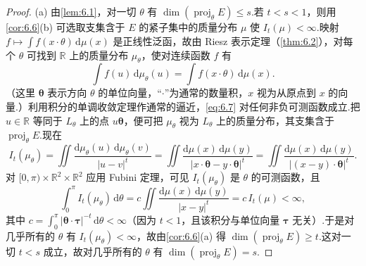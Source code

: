 \begin{proof}
(a) 由\cref{lem:6.1}，对一切 $\theta$ 有 $\dim(\operatorname{proj}_{\theta}E)\leq s$.若 $t<s<1$，则用\cref{cor:6.6}(b) 可选取支集含于 $E$ 的紧子集中的质量分布 $\mu$ 使 $I_t(\mu)<\infty$.映射 $f\mapsto\int f(x\cdot\theta)\,\mathrm{d}\mu(x)$ 是正线性泛函，故由 Riesz 表示定理（\cref{thm:6.2}），对每个 $\theta$ 可找到 $\mathbb{R}$ 上的质量分布 $\mu_\theta$，使对连续函数 $f$ 有
\begin{equation}\label{eq:6.7}
  \int f(u)\,\mathrm{d}\mu_\theta(u)=\int f(x\cdot\theta)\,\mathrm{d}\mu(x).
\end{equation}
（这里 $\boldsymbol{\theta}$ 表示方向 $\theta$ 的单位向量，``$\cdot$''为通常的数量积，$x$ 视为从原点到 $x$ 的向量.）利用积分的单调收敛定理作通常的逼近，\eqref{eq:6.7} 对任何非负可测函数成立.把 $u\in\mathbb{R}$ 等同于 $L_{\theta}$ 上的点 $u\boldsymbol{\theta}$，便可把 $\mu_\theta$ 视为 $L_{\theta}$ 上的质量分布，其支集含于 $\operatorname{proj}_{\theta}E$.现在
\[
  I_t(\mu_\theta)
  =\iint\frac{\mathrm{d}\mu_\theta(u)\,\mathrm{d}\mu_\theta(v)}{|u-v|^{t}}
  =\iint\frac{\mathrm{d}\mu(x)\,\mathrm{d}\mu(y)}{|x\cdot\boldsymbol{\theta}-y\cdot\boldsymbol{\theta}|^{t}}
  =\iint\frac{\mathrm{d}\mu(x)\,\mathrm{d}\mu(y)}{|(x-y)\cdot\boldsymbol{\theta}|^{t}}.
\]
对 $[0,\pi)\times\mathbb{R}^2\times\mathbb{R}^2$ 应用 Fubini 定理，可见 $I_t(\mu_\theta)$ 是 $\theta$ 的可测函数，且
\[
  \int_{0}^{\pi}I_t(\mu_\theta)\,\mathrm{d}\theta
  =c\iint\frac{\mathrm{d}\mu(x)\,\mathrm{d}\mu(y)}{|x-y|^{t}}
  =c\,I_t(\mu)<\infty,
\]
其中 $c=\int_{0}^{\pi}|\boldsymbol{\theta}\cdot\boldsymbol{\tau}|^{-t}\,\mathrm{d}\theta<\infty$（因为 $t<1$，且该积分与单位向量 $\boldsymbol{\tau}$ 无关）.于是对几乎所有的 $\theta$ 有 $I_t(\mu_\theta)<\infty$，故由\cref{cor:6.6}(a) 得 $\dim(\operatorname{proj}_{\theta}E)\geq t$.这对一切 $t<s$ 成立，故对几乎所有的 $\theta$ 有 $\dim(\operatorname{proj}_{\theta}E)=s$.


\end{proof}

